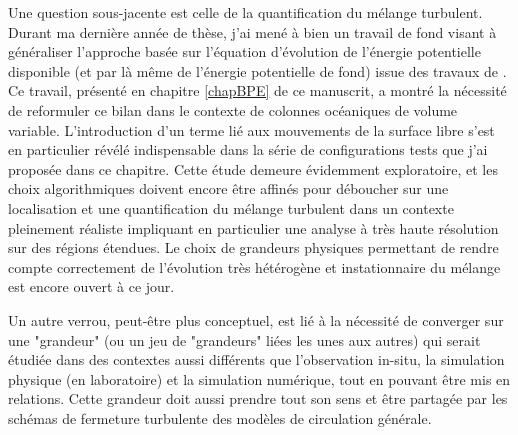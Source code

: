 Une question sous-jacente est celle de la quantification du mélange turbulent. Durant ma dernière année de thèse, j'ai mené à bien un travail de fond visant à généraliser l'approche basée sur l'équation d'évolution de l'énergie potentielle disponible (et par là même de l'énergie potentielle de fond) issue des travaux de \cite{lorenz_available_1955}. Ce travail, présenté en chapitre \ref{chapBPE} de ce manuscrit, a montré la nécessité de reformuler ce bilan dans le contexte de colonnes océaniques de volume variable. L'introduction d'un terme lié aux mouvements de la surface libre s'est en particulier révélé indispensable dans la série de configurations tests que j'ai proposée dans ce chapitre.%
Cette étude demeure évidemment exploratoire, et les choix algorithmiques doivent encore être affinés pour déboucher sur une localisation et une quantification du mélange turbulent dans un contexte pleinement réaliste impliquant en particulier une analyse à très haute résolution sur des régions étendues. Le choix de grandeurs physiques permettant de rendre compte correctement de l'évolution très hétérogène et instationnaire du mélange est encore ouvert à ce jour.

Un autre verrou, peut-être plus conceptuel, est lié à la nécessité de converger sur une "grandeur" (ou un jeu de "grandeurs" liées les unes aux autres) qui serait étudiée dans des contextes aussi différents que l'observation in-situ, la simulation physique (en laboratoire) et la simulation numérique, tout en pouvant être mis en relations. Cette grandeur doit aussi prendre tout son sens et être partagée par les schémas de fermeture turbulente des modèles de circulation générale.



